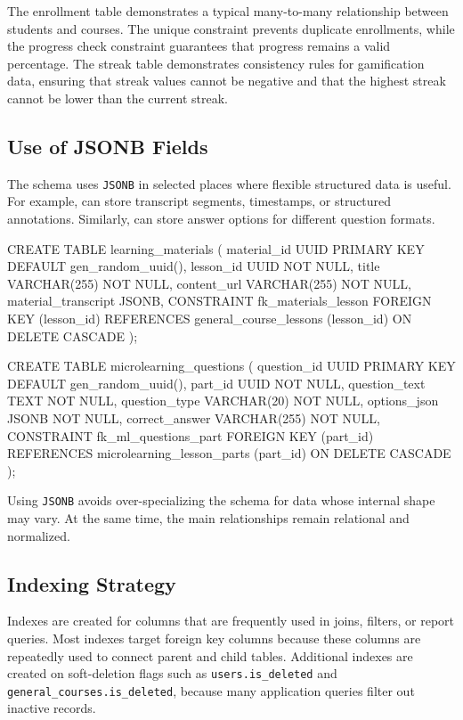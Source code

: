 The enrollment table demonstrates a typical many-to-many relationship between students and courses. The unique constraint prevents duplicate enrollments, while the progress check constraint guarantees that progress remains a valid percentage. The streak table demonstrates consistency rules for gamification data, ensuring that streak values cannot be negative and that the highest streak cannot be lower than the current streak.

\subsection{Use of JSONB Fields}

The schema uses \texttt{JSONB} in selected places where flexible structured data is useful. For example,  can store transcript segments, timestamps, or structured annotations. Similarly,  can store answer options for different question formats.

\begin{sqlcode}[caption={Representative JSONB fields},label={lst:ddl-jsonb-examples}]
CREATE TABLE learning_materials (
    material_id UUID PRIMARY KEY DEFAULT gen_random_uuid(),
    lesson_id UUID NOT NULL,
    title VARCHAR(255) NOT NULL,
    content_url VARCHAR(255) NOT NULL,
    material_transcript JSONB,
    CONSTRAINT fk_materials_lesson
        FOREIGN KEY (lesson_id)
        REFERENCES general_course_lessons (lesson_id)
        ON DELETE CASCADE
);

CREATE TABLE microlearning_questions (
    question_id UUID PRIMARY KEY DEFAULT gen_random_uuid(),
    part_id UUID NOT NULL,
    question_text TEXT NOT NULL,
    question_type VARCHAR(20) NOT NULL,
    options_json JSONB NOT NULL,
    correct_answer VARCHAR(255) NOT NULL,
    CONSTRAINT fk_ml_questions_part
        FOREIGN KEY (part_id)
        REFERENCES microlearning_lesson_parts (part_id)
        ON DELETE CASCADE
);
\end{sqlcode}

Using \texttt{JSONB} avoids over-specializing the schema for data whose internal shape may vary. At the same time, the main relationships remain relational and normalized.

\subsection{Indexing Strategy}

Indexes are created for columns that are frequently used in joins, filters, or report queries. Most indexes target foreign key columns because these columns are repeatedly used to connect parent and child tables. Additional indexes are created on soft-deletion flags such as \texttt{users.is\_deleted} and \texttt{general\_courses.is\_deleted}, because many application queries filter out inactive records.

